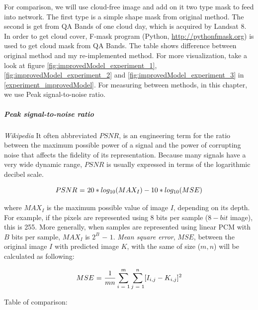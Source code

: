 For comparison, we will use cloud-free image and add on it two type mask to feed into network. The first type is a simple shape mask from original method. The second is get from QA Bands of one cloud day, which is acquired by Landsat 8. In order to get cloud cover, F-mask program (Python, \href{http://pythonfmask.org}{http://pythonfmask.org}) is used to get cloud mask from QA Bands. The table shows difference between original method and my re-implemented method. For more visualization, take a look at figure \ref{fig:improvedModel_experiment_1}, \ref{fig:improvedModel_experiment_2} and \ref{fig:improvedModel_experiment_3} in \ref{experiment_improvedModel}. For measuring between methods, in this chapter, we use Peak signal-to-noise ratio.

\subparagraph{Peak signal-to-noise ratio} \textit{Wikipedia} It often abbreviated $PSNR$, is an engineering term for the ratio between the maximum possible power of a signal and the power of corrupting noise that affects the fidelity of its representation. Because many signals have a very wide dynamic range, $PSNR$ is usually expressed in terms of the logarithmic decibel scale. 

\begin{equation}
\centering
PSNR \textrm{ = } 20 * log_{10}(MAX_I) - 10 * log_{10}(MSE)
\end{equation}

where $MAX_I$ is the maximum possible value of image $I$, depending on its depth. For example, if the pixels are represented using 8 bits per sample ($8-bit$ image), this is 255. More generally, when samples are represented using linear PCM with $B$ bits per sample, $MAX_I$ is $2^B$ $-$ $1$. \textit{Mean square error}, $MSE$, between the original image $I$ with predicted image $K$, with the same of size ($m, n$) will be calculated as following:

\begin{equation}
\centering
MSE \textrm{ = } \frac{1}{mn} \sum_{i \textrm{ = } 1}^{m} \sum_{j \textrm{ = } 1}^{n} [I_{i,j} - K_{i,j}]^2
\end{equation}

\vspace{0.3cm}
Table of comparison:

